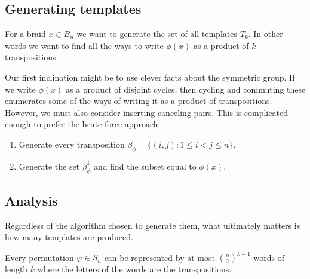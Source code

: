 \documentclass[12pt]{thesis}
\begin{document}
\subsection{Generating templates}

For a braid $x \in B_{n}$ 
we want to generate the set of all templates $T_{k}$.
In other words we want to find all the ways
to write $\phi(x)$ as a product of $k$ transpositions.

Our first inclination might be to use clever facts about the symmetric group.
If we write $\phi(x)$ as a product of disjoint cycles,
then cycling and commuting these enumerates some of the ways of writing it as a product of transpositions.
However, we must also consider inserting canceling pairs.
This is complicated enough to prefer the brute force approach:
\begin{algorithm}

\begin{enumerate}
    \item Generate every transposition $\beta_{\phi} = \{ (i, j) \colon 1 \leq i < j \leq n \}$.
    \item Generate the set $\beta_{\phi}^{k}$ and find the subset equal to $\phi(x)$.
\end{enumerate}

\end{algorithm}

\subsection{Analysis}

Regardless of the algorithm chosen to generate them,
what ultimately matters is how many templates are produced.

\begin{lemma}
    Every permutation $\varphi \in S_{n}$
    can be represented by at most ${ n \choose 2}^{k -1}$
    words of length $k$
    where the letters of the words are the transpositions.
\end{lemma}
\end{document}
